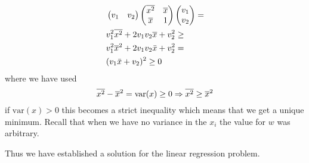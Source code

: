 \begin{align}
  &\begin{pmatrix}
    v_{1}  & v_{2}
  \end{pmatrix}
  \begin{pmatrix}
    \overline{x^2}  & \overline{x} \\
    \overline{x}  & 1
  \end{pmatrix}
  \begin{pmatrix}
    v_{1} \\
    v_{2}
  \end{pmatrix}=\\
  &v_{1}^2\overline{x^2} + 2v_{1}v_{2} \overline{x}+v_{2}^2 \geq \\
  & v_{1}^2\overline{x}^2 + 2v_{1}v_{2}\bar{x}+v_{2}^2 = \\
  &(v_{1}\bar{x}+v_{2})^2\geq0
\end{align}
where we have used 
\begin{equation}
  \overline{x^2}-\overline{x}^2 = \text{var}(x)\geq 0 \Rightarrow
  \overline{x^2} \geq \overline{x}^2
\end{equation}
if $\text{var}(x)>0$ this becomes a strict inequality which means that we get a unique minimum.
Recall that when we have no variance in the $x_i$ the value for $w$ was arbitrary.

Thus we have established a solution for the linear regression problem.

